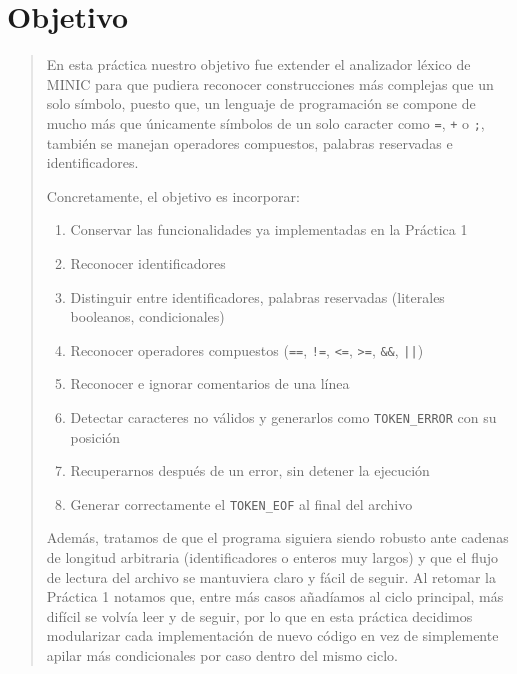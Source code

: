 \documentclass[12pt,letterpaper]{article}
\newcommand{\minic}{
  {M\footnotesize INI\normalsize C}
}
\begin{document}
\thispagestyle{empty}


\newpage

\section*{Objetivo}

\begin{quote}
  En esta práctica nuestro objetivo fue extender el analizador léxico de \minic para que pudiera reconocer
  construcciones más complejas que un solo símbolo, puesto que, un lenguaje de programación se compone de mucho
  más que únicamente símbolos de un solo caracter como \texttt{=}, \texttt{+} o \texttt{;}, también se manejan
  operadores compuestos, palabras reservadas e identificadores.

  Concretamente, el objetivo es incorporar:
  
  \begin{enumerate}[label=\arabic*.]
  \item Conservar las funcionalidades ya implementadas en la Práctica 1
  \item Reconocer identificadores
  \item Distinguir entre identificadores, palabras reservadas (literales booleanos, condicionales)
  \item Reconocer operadores compuestos (\texttt{==}, \texttt{!=}, \texttt{<=}, \texttt{>=},
    \texttt{\&\&}, \texttt{||})
  \item Reconocer e ignorar comentarios de una línea
  \item Detectar caracteres no válidos y generarlos como \texttt{TOKEN\_ERROR} con su posición
  \item Recuperarnos  después de un error, sin detener la ejecución
  \item Generar correctamente el \texttt{TOKEN\_EOF} al final del archivo
  \end{enumerate}
  
  Además, tratamos de que el programa siguiera siendo robusto ante cadenas de longitud arbitraria
  (identificadores o enteros muy largos) y que el flujo de lectura del archivo se mantuviera claro y fácil
  de seguir. Al retomar la Práctica 1 notamos que, entre más casos añadíamos al ciclo principal, más difícil se
  volvía leer y de seguir, por lo que en esta práctica decidimos modularizar cada implementación de nuevo
  código en vez de simplemente apilar más condicionales por caso dentro del mismo ciclo.
\end{quote}
\end{document}

